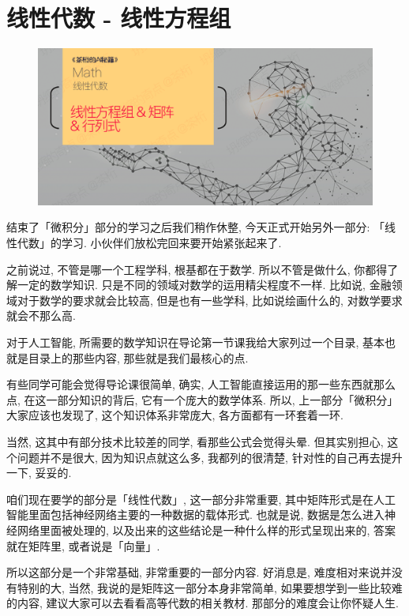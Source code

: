 \chapter{线性代数 - 线性方程组}

\begin{figure}[ht]
  \centering
  \includegraphics[width=1\linewidth]{asset/20230905111111.png}
\end{figure}

\newpage

结束了「微积分」部分的学习之后我们稍作休整, 今天正式开始另外一部分: 「线性代数」的学习. 小伙伴们放松完回来要开始紧张起来了. 

之前说过, 不管是哪一个工程学科, 根基都在于数学. 所以不管是做什么, 你都得了解一定的数学知识. 只是不同的领域对数学的运用精尖程度不一样. 比如说, 金融领域对于数学的要求就会比较高, 但是也有一些学科, 比如说绘画什么的, 对数学要求就会不那么高. 

对于人工智能, 所需要的数学知识在导论第一节课我给大家列过一个目录, 基本也就是目录上的那些内容, 那些就是我们最核心的点. 

有些同学可能会觉得导论课很简单, 确实, 人工智能直接运用的那一些东西就那么点, 在这一部分知识的背后, 它有一个庞大的数学体系. 所以, 上一部分「微积分」大家应该也发现了, 这个知识体系非常庞大, 各方面都有一环套着一环. 

当然, 这其中有部分技术比较差的同学, 看那些公式会觉得头晕. 但其实别担心, 这个问题并不是很大, 因为知识点就这么多, 我都列的很清楚, 针对性的自己再去提升一下, 妥妥的. 

咱们现在要学的部分是「线性代数」, 这一部分非常重要, 其中矩阵形式是在人工智能里面包括神经网络主要的一种数据的载体形式. 也就是说, 数据是怎么进入神经网络里面被处理的, 以及出来的这些结论是一种什么样的形式呈现出来的, 答案就在矩阵里, 或者说是「向量」. 

所以这部分是一个非常基础, 非常重要的一部分内容. 好消息是, 难度相对来说并没有特别的大, 当然, 我说的是矩阵这一部分本身非常简单, 如果要想学到一些比较难的内容, 建议大家可以去看看高等代数的相关教材. 那部分的难度会让你怀疑人生.

